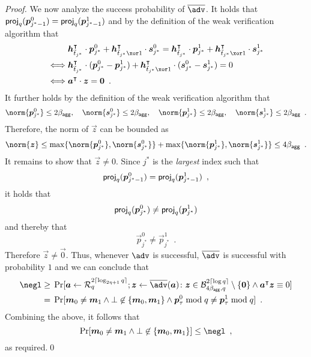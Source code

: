 \begin{proof}
  We now analyze the success probability of $\sisadv$.
  It holds that $\mathsf{proj}_{q}(\boldsymbol{p}_{j^*-1}^0) = \mathsf{proj}_{q}(\boldsymbol{p}_{j^*-1}^1)$ and by the definition of the weak verification algorithm that
  \begin{align*}
    &\vec{h}_{\tilde t_{j^*}}^\transpose\cdot\vec{p}_{j^*}^0 + \vec{h}_{\tilde t_{j^*}\xor 1}^\transpose\cdot\vec{s}_{j^*}^0 = \vec{h}_{\tilde t_{j^*}}^\transpose\cdot\vec{p}_{j^*}^1 + \vec{h}_{\tilde t_{j^*}\xor 1}^\transpose\cdot\vec{s}_{j^*}^1\\
    \iff&\vec{h}_{\tilde t_{j^*}}^\transpose\cdot(\vec{p}_{j^*}^0-\vec{p}_{j^*}^1) + \vec{h}_{\tilde t_{j^*}\xor 1}^\transpose\cdot(\vec{s}_{j^*}^0-\vec{s}_{j^*}^1) = 0\\
    \iff&\vec{a}^\transpose\cdot\vec{z} = \vec{0} \enspace.
  \end{align*}
  It further holds by the definition of the weak verification algorithm that 
  \[
  \norm{\vec{p}_{j^*}^0} \leq 2\bagg,\quad \norm{\vec{s}_{j^*}^0} \leq 2\bagg, \quad\norm{\vec{p}_{j^*}^1} \leq 2\bagg, \quad \norm{\vec{s}_{j^*}^1} \leq 2\bagg\enspace.
  \]
  Therefore, the norm of $\vec{z}$ can be bounded as
  \[
  \norm{\vec{z}} \leq \max\{\norm{\vec{p}_{j^*}^0},\norm{\vec{s}_{j^*}^0}\}+\max\{\norm{\vec{p}_{j^*}^1},\norm{\vec{s}_{j^*}^1}\} \leq 4\bagg\enspace.
  \]
  It remains to show that $\vec{z}\neq 0$.
  Since $j^*$ is the \emph{largest} index such that 
  \[
    \mathsf{proj}_{q}(\boldsymbol{p}_{j^*-1}^0) =  \mathsf{proj}_{q}(\boldsymbol{p}_{j^*-1}^1)\enspace,
  \]
  it holds that
  \[
    \mathsf{proj}_{q}(\boldsymbol{p}_{j^*}^0) \neq \mathsf{proj}_{q}(\boldsymbol{p}_{j^*}^1)
  \]
  and thereby that
  \[
    \vec{p}_{j^*}^0 \neq \vec{p}_{j^*}^1\enspace.
  \]
  Therefore $\vec{z}\neq\vec{0}$.
  Thus, whenever $\adv$ is successful, $\sisadv$ is successful with probability $1$ and we can conclude that
  \begin{align*}
  \negl \geq{}& \Pr[
      \vec{a} \gets \ring_q^{2\lceil\log_{2\eta+1} q\rceil}; \vec{z}\gets\sisadv(\vec{a}) \colon \vec{z}\in\ball{4\bagg}{q}^{2\lceil\log q\rceil}\setminus\{\vec{0}\} \land \vec{a}^\transpose\vec{z}\equiv 0
    ]\\
    ={}&
    \Pr[\vec{m}_0\neq \vec{m}_1 \land \bot\not\in\{\vec{m}_0,\vec{m}_1\} \land \vec{p}_\tau^0 \bmod q\neq \vec{p}_\tau^1\bmod q]\enspace.
  \end{align*}
  Combining the above, it follows that
  \[
    \Pr[\vec{m}_0\neq \vec{m}_1 \land \bot\not\in\{\vec{m}_0,\vec{m}_1\}] \leq \negl\enspace,
  \]
  as required.\qed
\end{proof}

